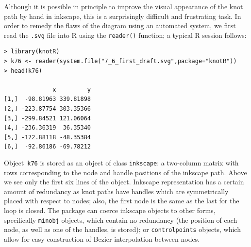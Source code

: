 \documentclass{birkjour}
\theoremstyle{definition}
\theoremstyle{remark}
\numberwithin{equation}{section}
\begin{document}
Although it is possible in principle to improve the visual appearance
of the knot path by hand in inkscape, this is a surprisingly difficult
and frustrating task.  In order to remedy the flaws of the diagram
using an automated system, we first read the {\tt .svg} file into R
using the {\tt reader()} function; a typical R session follows:

\begin{verbatim}
> library(knotR)
> k76 <- reader(system.file("7_6_first_draft.svg",package="knotR"))
> head(k76)

              x         y
[1,]  -98.81963 339.81898
[2,] -223.87754 303.35366
[3,] -299.84521 121.06064
[4,] -236.36319  36.35340
[5,] -172.88118 -48.35384
[6,]  -92.86186 -69.78212
\end{verbatim}

Object~{\tt k76} is stored as an object of class {\tt inkscape}: a
two-column matrix with rows corresponding to the node and handle
positions of the inkscape path.  Above we see only the first six lines
of the object.  Inkscape representation has a certain amount of
redundancy as knot paths have handles which are symmetrically placed
with respect to nodes; also, the first node is the same as the last
for the loop is closed.  The package can coerce inkscape objects to
other forms, specifically {\tt minobj} objects, which contain no
redundancy (the position of each node, as well as one of the handles,
is stored); or {\tt controlpoints} objects, which allow for easy
construction of Bezier interpolation between nodes.
\end{document}
